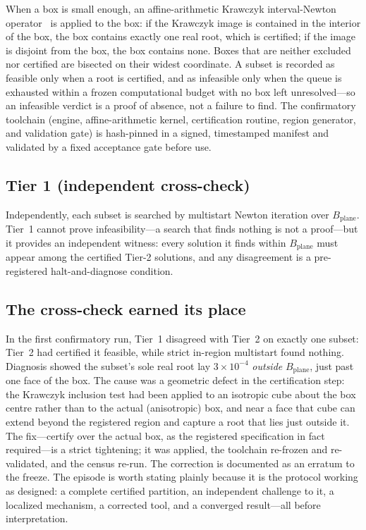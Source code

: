 \documentclass[pdflatex,sn-mathphys-num]{sn-jnl}
\newcommand{\Bplane}{B_{\mathrm{plane}}}
\begin{document}
When a box is small enough, an affine-arithmetic Krawczyk interval-Newton operator~\cite{Moore1966,Krawczyk1969,Neumaier1990} is applied to the box: if the Krawczyk image is contained in the interior of the box, the box contains exactly one real root, which is certified; if the image is disjoint from the box, the box contains none. Boxes that are neither excluded nor certified are bisected on their widest coordinate. A subset is recorded as feasible only when a root is certified, and as infeasible only when the queue is exhausted within a frozen computational budget with no box left unresolved---so an infeasible verdict is a proof of absence, not a failure to find. The confirmatory toolchain (engine, affine-arithmetic kernel, certification routine, region generator, and validation gate) is hash-pinned in a signed, timestamped manifest and validated by a fixed acceptance gate before use.

\subsection*{Tier 1 (independent cross-check)}
Independently, each subset is searched by multistart Newton iteration over $\Bplane$. Tier~1 cannot prove infeasibility---a search that finds nothing is not a proof---but it provides an independent witness: every solution it finds within $\Bplane$ must appear among the certified Tier-2 solutions, and any disagreement is a pre-registered halt-and-diagnose condition.

\subsection*{The cross-check earned its place}
In the first confirmatory run, Tier~1 disagreed with Tier~2 on exactly one subset: Tier~2 had certified it feasible, while strict in-region multistart found nothing. Diagnosis showed the subset's sole real root lay $3\times10^{-4}$ \emph{outside} $\Bplane$, just past one face of the box. The cause was a geometric defect in the certification step: the Krawczyk inclusion test had been applied to an isotropic cube about the box centre rather than to the actual (anisotropic) box, and near a face that cube can extend beyond the registered region and capture a root that lies just outside it. The fix---certify over the actual box, as the registered specification in fact required---is a strict tightening; it was applied, the toolchain re-frozen and re-validated, and the census re-run. The correction is documented as an erratum to the freeze. The episode is worth stating plainly because it is the protocol working as designed: a complete certified partition, an independent challenge to it, a localized mechanism, a corrected tool, and a converged result---all before interpretation.
\end{document}
